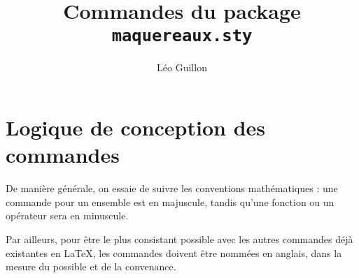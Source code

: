 \documentclass[print]{atomathematyk}
\title{Commandes du package \texttt{maquereaux.sty}}
\author{Léo Guillon}
\date{}
\begin{document}
\maketitle

\section{Logique de conception des commandes}

De manière générale, on essaie de suivre les conventions mathématiques : une commande pour un ensemble est en majuscule, tandis qu’une fonction ou un opérateur sera en minuscule.

Par ailleurs, pour être le plus consistant possible avec les autres commandes déjà existantes en \LaTeX, les commandes doivent être nommées en anglais, dans la mesure du possible et de la convenance.
\end{document}
